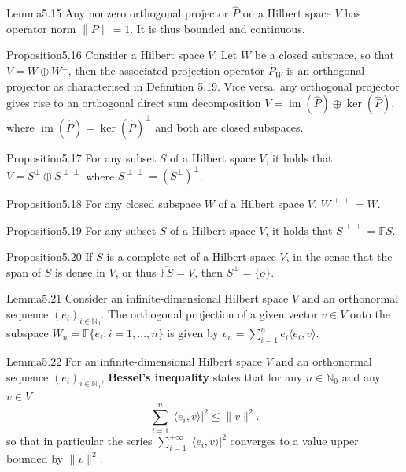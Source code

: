 \begin{res}{Lemma}{5.15}
Any nonzero orthogonal projector $\hat P$ on a Hilbert space $V$ has operator norm $\|P\|=1$. It is thus bounded and continuous.
\end{res}

\begin{res}{Proposition}{5.16}
Consider a Hilbert space $V$. Let $W$ be a closed subspace, so that $V=W\oplus W^\perp$, then the associated projection operator $\hat P_W$ is an orthogonal projector as characterised in Definition 5.19. Vice versa, any orthogonal projector gives rise to an orthogonal direct sum decomposition $V=\operatorname{im}(\hat P)\oplus\ker(\hat P)$, where $\operatorname{im}(\hat P)=\ker(\hat P)^\perp$ and both are closed subspaces.
\end{res}

\begin{res}{Proposition}{5.17}
For any subset $S$ of a Hilbert space $V$, it holds that $V=S^\perp\oplus S^{\perp\perp}$ where $S^{\perp\perp}=(S^\perp)^\perp$.
\end{res}

\begin{res}{Proposition}{5.18}
For any closed subspace $W$ of a Hilbert space $V$, $W^{\perp\perp}=W$.
\end{res}

\begin{res}{Proposition}{5.19}
For any subset $S$ of a Hilbert space $V$, it holds that $S^{\perp\perp}=\overline{\mathbb FS}$.
\end{res}

\begin{res}{Proposition}{5.20}
If $S$ is a complete set of a Hilbert space $V$, in the sense that the span of $S$ is dense in $V$, or thus $\overline{\mathbb FS}=V$, then $S^\perp=\{o\}$.
\end{res}

\begin{res}{Lemma}{5.21}
Consider an infinite-dimensional Hilbert space $V$ and an orthonormal sequence $(e_i)_{i\in\mathbb N_0}$. The orthogonal projection of a given vector $v\in V$ onto the subspace $W_n=\mathbb F\{e_i;i=1,\dots,n\}$ is given by $v_n=\sum_{i=1}^ne_i\langle e_i,v\rangle$.
\end{res}

\begin{res}{Lemma}{5.22}
For an infinite-dimensional Hilbert space $V$ and an orthonormal sequence $(e_i)_{i\in\mathbb N_0}$, \textbf{Bessel's inequality} states that for any $n\in\mathbb N_0$ and any $v\in V$
\begin{equation}\sum_{i=1}^n|\langle e_i,v\rangle|^2\le\|v\|^2.\tag{5.25}\end{equation}
so that in particular the series $\sum_{i=1}^{+\infty}|\langle e_i,v\rangle|^2$ converges to a value upper bounded by $\|v\|^2$.
\end{res}

